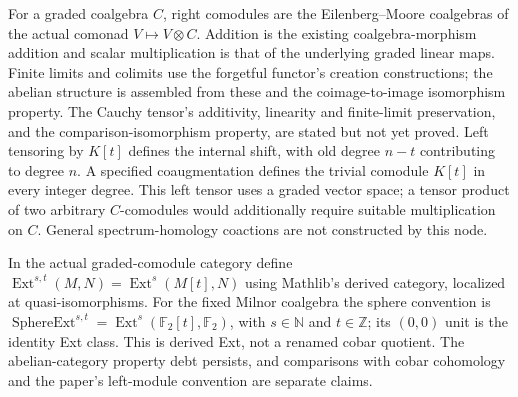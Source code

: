 \begin{definition}
  \label{def:actual-graded-right-comodules}
  For a graded coalgebra $C$, right comodules are the Eilenberg--Moore
  coalgebras of the actual comonad $V\mapsto V\otimes C$.
  Addition is the existing coalgebra-morphism addition and scalar
  multiplication is that of the underlying graded linear maps.
  Finite limits and colimits use the forgetful functor's creation
  constructions; the abelian structure is assembled from these and the
  coimage-to-image isomorphism property. The Cauchy tensor's additivity,
  linearity and finite-limit preservation, and the comparison-isomorphism
  property, are stated but not yet proved.
  Left tensoring by $K[t]$ defines the internal shift, with old degree
  $n-t$ contributing to degree $n$. A specified coaugmentation defines
  the trivial comodule $K[t]$ in every integer degree. This left tensor
  uses a graded vector space; a tensor product of two arbitrary
  $C$-comodules would additionally require suitable multiplication on $C$.
  General spectrum-homology coactions are not constructed by this node.
\end{definition}

\begin{definition}
  \label{def:milnor-derived-ext}
  In the actual graded-comodule category define
  $\operatorname{Ext}^{s,t}(M,N)=\operatorname{Ext}^s(M[t],N)$ using
  Mathlib's derived category, localized at quasi-isomorphisms.
  For the fixed Milnor coalgebra the sphere convention is
  $\operatorname{SphereExt}^{s,t}=\operatorname{Ext}^s(\mathbb F_2[t],\mathbb F_2)$,
  with $s\in\mathbb N$ and $t\in\mathbb Z$; its $(0,0)$ unit is the
  identity Ext class. This is derived Ext, not a renamed cobar quotient.
  The abelian-category property debt persists, and comparisons with cobar
  cohomology and the paper's left-module convention are separate claims.
\end{definition}

